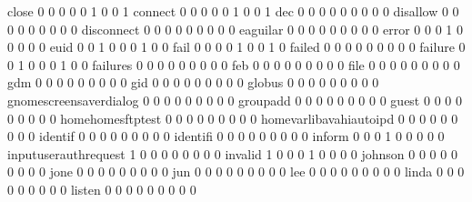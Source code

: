 \documentclass[compress,8pt]{beamer}
\begin{document}
\begin{frame}
\begin{Schunk}
  close                                      0   0   0   0   0   1   0   0   1
  connect                                    0   0   0   0   0   1   0   0   1
  dec                                        0   0   0   0   0   0   0   0   0
  disallow                                   0   0   0   0   0   0   0   0   0
  disconnect                                 0   0   0   0   0   0   0   0   0
  eaguilar                                   0   0   0   0   0   0   0   0   0
  error                                      0   0   0   1   0   0   0   0   0
  euid                                       0   0   1   0   0   0   1   0   0
  fail                                       0   0   0   0   1   0   0   1   0
  failed                                     0   0   0   0   0   0   0   0   0
  failure                                    0   0   1   0   0   0   1   0   0
  failures                                   0   0   0   0   0   0   0   0   0
  feb                                        0   0   0   0   0   0   0   0   0
  file                                       0   0   0   0   0   0   0   0   0
  gdm                                        0   0   0   0   0   0   0   0   0
  gid                                        0   0   0   0   0   0   0   0   0
  globus                                     0   0   0   0   0   0   0   0   0
  gnomescreensaverdialog                     0   0   0   0   0   0   0   0   0
  groupadd                                   0   0   0   0   0   0   0   0   0
  guest                                      0   0   0   0   0   0   0   0   0
  homehomesftptest                           0   0   0   0   0   0   0   0   0
  homevarlibavahiautoipd                     0   0   0   0   0   0   0   0   0
  identif                                    0   0   0   0   0   0   0   0   0
  identifi                                   0   0   0   0   0   0   0   0   0
  inform                                     0   0   0   1   0   0   0   0   0
  inputuserauthrequest                       1   0   0   0   0   0   0   0   0
  invalid                                    1   0   0   0   1   0   0   0   0
  johnson                                    0   0   0   0   0   0   0   0   0
  jone                                       0   0   0   0   0   0   0   0   0
  jun                                        0   0   0   0   0   0   0   0   0
  lee                                        0   0   0   0   0   0   0   0   0
  linda                                      0   0   0   0   0   0   0   0   0
  listen                                     0   0   0   0   0   0   0   0   0

\end{Schunk}
\end{frame}
\end{document}
